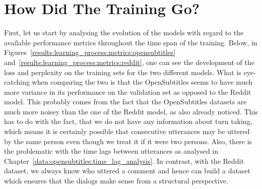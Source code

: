 \section{How Did The Training Go?}
First, let us start by analysing the evolution of the models with regard to the available performance metrics throughout the time span of the training. Below, in Figures~\ref{results:learning_process:metrics:opensubtitles} and~\ref{results:learning_process:metrics:reddit}, one can see the development of the loss and perplexity on the training sets for the two different models.
What is eye-catching when comparing the two is that the OpenSubtitles seems to have much more variance in its performance on the validation set as opposed to the Reddit model. This probably comes from the fact that the OpenSubtitles datasets are much more noisey than the one of the Reddit model, as \cite{Vinyals:2015} also already noticed. This has to do with the fact, that we do not have any information about turn taking, which means it is certainly possible that consecutive utterances may be uttered by the same person even though we treat it if it were two persons. Also, there is the problematic with the time lags between utterances as analysed in Chapter~\ref{data:opensubtitles:time_lag_analysis}. In contrast, with the Reddit dataset, we always know who uttered a comment and hence can build a dataset which ensures that the dialogs make sense from a structural perspective.
